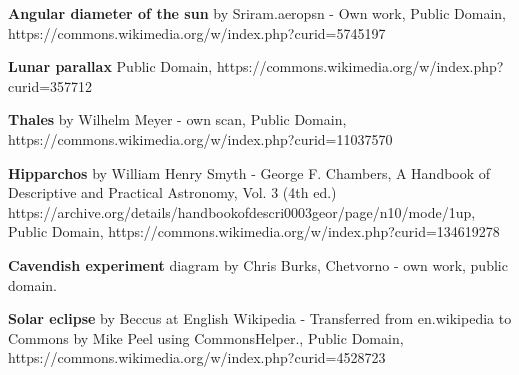 \documentclass[aspectratio=169,xcolor=pdftex,dvipsnames]{beamer} %
\begin{document}
\begin{frame}
{\textbf{Angular diameter of the sun} by Sriram.aeropsn - Own work, Public Domain, https://commons.wikimedia.org/w/index.php?curid=5745197

\textbf{Lunar parallax} Public Domain, https://commons.wikimedia.org/w/index.php?curid=357712

\textbf{Thales} by Wilhelm Meyer - own scan, Public Domain, https://commons.wikimedia.org/w/index.php?curid=11037570

\textbf{Hipparchos} by William Henry Smyth - George F. Chambers, A Handbook of Descriptive and Practical Astronomy, Vol. 3 (4th ed.) https://archive.org/details/handbookofdescri0003geor/page/n10/mode/1up, Public Domain, https://commons.wikimedia.org/w/index.php?curid=134619278

\textbf{Cavendish experiment} diagram by Chris Burks, Chetvorno - own work, public domain.

\textbf{Solar eclipse} by Beccus at English Wikipedia - Transferred from en.wikipedia to Commons by Mike Peel using CommonsHelper., Public Domain, https://commons.wikimedia.org/w/index.php?curid=4528723

}

\end{frame}

\end{document}
